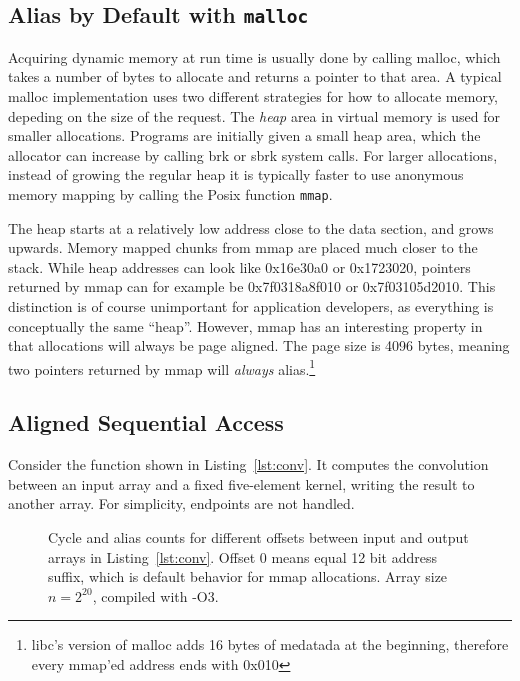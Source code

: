 \documentclass[a4paper,10pt,twocolumn,twoside]{article}
\begin{document}
\subsection{Alias by Default with \texttt{malloc}}
Acquiring dynamic memory at run time is usually done by calling malloc, which takes a number of bytes to allocate and returns a pointer to that area.
A typical malloc implementation uses two different strategies for how to allocate memory, depeding on the size of the request.
The \emph{heap} area in virtual memory is used for smaller allocations.
Programs are initially given a small heap area, which the allocator can increase by calling brk or sbrk system calls.
For larger allocations, instead of growing the regular heap it is typically faster to use anonymous memory mapping by calling the Posix function \texttt{mmap}.

The heap starts at a relatively low address close to the data section, and grows upwards.
Memory mapped chunks from mmap are placed much closer to the stack.
While heap addresses can look like 0x16e30a0 or 0x1723020, pointers returned by mmap can for example be 0x7f0318a8f010 or 0x7f03105d2010.
This distinction is of course unimportant for application developers, as everything is conceptually the same ``heap''.
However, mmap has an interesting property in that allocations will always be page aligned.
The page size is 4096 bytes, meaning two pointers returned by mmap will \emph{always} alias.\footnote{libc's version of malloc adds 16 bytes of medatada at the beginning, therefore every mmap'ed address ends with 0x010}


\subsection{Aligned Sequential Access}
Consider the function shown in Listing~\ref{lst:conv}.
It computes the convolution between an input array and a fixed five-element kernel, writing the result to another array.
For simplicity, endpoints are not handled.

\begin{figure}[t]
  \caption{Cycle and alias counts for different offsets between input and output arrays in Listing~\ref{lst:conv}. Offset 0 means equal 12 bit address suffix, which is default behavior for mmap allocations. Array size $n=2^{20}$, compiled with -O3. }
  \label{fig:heapalias}
\end{figure}
\end{document}
